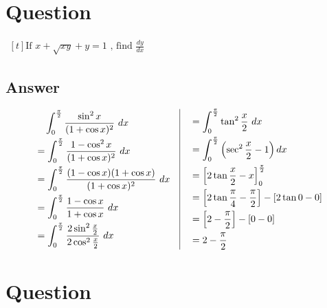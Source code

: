 \documentclass[17pt]{extarticle}
\begin{document}
\noindent
\begin{fleqn} 


\section{Question} 

$\begin{aligned}[t] 
\text{If \ } x + \sqrt{xy} + y = 1 \text{\ , \  find \ \  } \frac{dy}{dx}
\end{aligned}$

\subsection*{Answer}
\begin{equation} \nonumber
\begin{alignedat}{4}
& \quad  \int_{0}^{\frac{\pi}{2}} \frac{\sin^2x}{(1 + \cos x)^2}\ dx\\
&= \int_{0}^{\frac{\pi}{2}} \frac{1 -\cos^2x}{(1 + \cos x)^2}\ dx\\
&= \int_{0}^{\frac{\pi}{2}} \frac{(1 -\cos x)(1 +\cos x)}{(1 + \cos x)^2}\ dx\\
&= \int_{0}^{\frac{\pi}{2}} \frac{1 -\cos x}{1 + \cos x}\ dx\\
&= \int_{0}^{\frac{\pi}{2}} \frac{2\sin^2\frac{x}{2}}{2\cos^2\frac{x}{2}}\ dx\\
\end{alignedat}
\quad
\vrule
\quad
\begin{alignedat}{4}
&= \int_{0}^{\frac{\pi}{2}} \tan^2\frac{x}{2}\ dx\\
&= \int_{0}^{\frac{\pi}{2}} \left(\sec^2\frac{x}{2}-1\right)dx\\
&= \left[2\tan\frac{x}{2}-x\right]_{0}^{\frac{\pi}{2}}\\
&= \left[2\tan\frac{\pi}{4}-\frac{\pi}{2}\right]-\left[2\tan 0 - 0 \right]\\
&= \left[2 -\frac{\pi}{2}\right]-\left[0 - 0 \right]\\
&= 2 -\frac{\pi}{2}
\end{alignedat}
\end{equation}

\section{Question} 


\end{fleqn}
\end{document}
